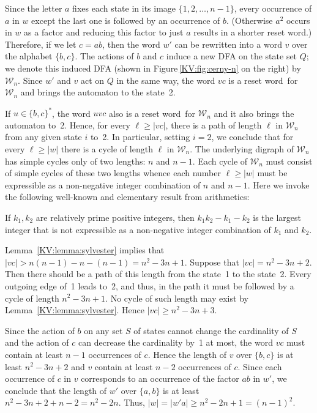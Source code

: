 \documentclass{irmaart}
\newcommand{\sw}{reset word}
\begin{document}
Since the letter $a$ fixes each state in its image
$\{1,2,\dots,n-1\}$, every occurrence of $a$ in $w$ except the
last one is followed by an occurrence of $b$. (Otherwise $a^2$
occurs in $w$ as a factor and reducing this factor to just $a$
results in a shorter \sw.) Therefore, if we let $c=ab$, then the
word $w'$ can be rewritten into a word $v$ over the alphabet
$\{b,c\}$. The actions of $b$ and $c$ induce a new DFA on the
state set $Q$; we denote this induced DFA (shown in
Figure\,\ref{KV:fig:cerny-n} on the right) by $\mathcal{W}_n$.
Since $w'$ and $v$ act on $Q$ in the same way, the word $vc$ is a
\sw\ for $\mathcal{W}_n$ and brings the automaton to the state~2.

If $u\in\{b,c\}^*$, the word $uvc$ also is a \sw\ for
$\mathcal{W}_n$ and it also brings the automaton to~2. Hence, for
every $\ell\ge|vc|$, there is a path of length $\ell$ in
$\mathcal{W}_n$ from any given state $i$ to~2. In particular,
setting $i=2$, we conclude that for every $\ell\ge|w|$ there is a
cycle of length $\ell$ in $\mathcal{W}_n$. The underlying digraph
of $\mathcal{W}_n$ has simple cycles only of two lengths: $n$ and
$n-1$. Each cycle of $\mathcal{W}_n$ must consist of simple cycles
of these two lengths whence each number $\ell\ge|w|$ must be
expressible as a non-negative integer combination of $n$ and
$n-1$. Here we invoke the following well-known and elementary
result from arithmetics:

\begin{lemma}
\label{KV:lemma:sylvester} If $k_1,k_2$ are relatively prime
positive integers, then $k_1k_2-k_1-k_2$ is the largest integer
that is not expressible as a non-negative integer combination of
$k_1$ and $k_2$.
\end{lemma}

Lemma~\ref{KV:lemma:sylvester} implies that
$|vc|>n(n-1)-n-(n-1)=n^2-3n+1$. Suppose that $|vc|=n^2-3n+2$. Then
there should be a path of this length from the state~1 to the
state~2. Every outgoing edge of~1 leads to~2, and thus, in the
path it must be followed by a cycle of length $n^2-3n+1$. No cycle
of such length may exist by Lemma~\ref{KV:lemma:sylvester}. Hence
$|vc|\ge n^2-3n+3$.

Since the action of $b$ on any set $S$ of states cannot change the
cardinality of $S$ and the action of $c$ can decrease the
cardinality by~1 at most, the word $vc$ must contain at least
$n-1$ occurrences of $c$. Hence the length of $v$ over $\{b,c\}$
is at least $n^2-3n+2$ and $v$ contain at least $n-2$ occurrences
of $c$. Since each occurrence of $c$ in $v$ corresponds to an
occurrence of the factor $ab$ in $w'$, we conclude that the length
of $w'$ over $\{a,b\}$ is at least $n^2-3n+2+n-2=n^2-2n$. Thus,
$|w|=|w'a|\ge n^2-2n+1=(n-1)^2$.
\end{document}
